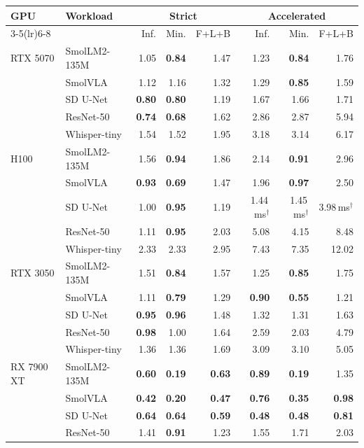 \begin{tabular}{llrrrrrr}
\toprule
GPU & Workload & \multicolumn{3}{c}{Strict} & \multicolumn{3}{c}{Accelerated} \\\cmidrule(lr){3-5}\cmidrule(lr){6-8} & & Inf. & Min. & F+L+B & Inf. & Min. & F+L+B \\
\midrule
RTX 5070 & SmolLM2-135M & 1.05 & \textbf{0.84} & 1.47 & 1.23 & \textbf{0.84} & 1.76 \\
 & SmolVLA & 1.12 & 1.16 & 1.32 & 1.29 & \textbf{0.85} & 1.59 \\
 & SD U-Net & \textbf{0.80} & \textbf{0.80} & 1.19 & 1.67 & 1.66 & 1.71 \\
 & ResNet-50 & \textbf{0.74} & \textbf{0.68} & 1.62 & 2.86 & 2.87 & 5.94 \\
 & Whisper-tiny & 1.54 & 1.52 & 1.95 & 3.18 & 3.14 & 6.17 \\
H100 & SmolLM2-135M & 1.56 & \textbf{0.94} & 1.86 & 2.14 & \textbf{0.91} & 2.96 \\
 & SmolVLA & \textbf{0.93} & \textbf{0.69} & 1.47 & 1.96 & \textbf{0.97} & 2.50 \\
 & SD U-Net & 1.00 & \textbf{0.95} & 1.19 & 1.44\,ms$^\dagger$ & 1.45\,ms$^\dagger$ & 3.98\,ms$^\dagger$ \\
 & ResNet-50 & 1.11 & \textbf{0.95} & 2.03 & 5.08 & 4.15 & 8.48 \\
 & Whisper-tiny & 2.33 & 2.33 & 2.95 & 7.43 & 7.35 & 12.02 \\
RTX 3050 & SmolLM2-135M & 1.51 & \textbf{0.84} & 1.57 & 1.25 & \textbf{0.85} & 1.75 \\
 & SmolVLA & 1.11 & \textbf{0.79} & 1.29 & \textbf{0.90} & \textbf{0.55} & 1.21 \\
 & SD U-Net & \textbf{0.95} & \textbf{0.96} & 1.48 & 1.32 & 1.31 & 1.63 \\
 & ResNet-50 & \textbf{0.98} & 1.00 & 1.64 & 2.59 & 2.03 & 4.79 \\
 & Whisper-tiny & 1.36 & 1.36 & 1.69 & 3.09 & 3.10 & 5.05 \\
RX 7900 XT & SmolLM2-135M & \textbf{0.60} & \textbf{0.19} & \textbf{0.63} & \textbf{0.89} & \textbf{0.19} & 1.35 \\
 & SmolVLA & \textbf{0.42} & \textbf{0.20} & \textbf{0.47} & \textbf{0.76} & \textbf{0.35} & \textbf{0.98} \\
 & SD U-Net & \textbf{0.64} & \textbf{0.64} & \textbf{0.59} & \textbf{0.48} & \textbf{0.48} & \textbf{0.81} \\
 & ResNet-50 & 1.41 & \textbf{0.91} & 1.23 & 1.55 & 1.71 & 2.03 \\

\end{tabular}
